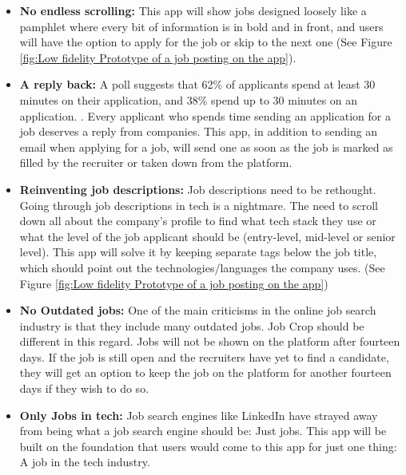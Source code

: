 \begin{itemize}
    \item \textbf{No endless scrolling:} This app will show jobs designed loosely like a pamphlet where every bit of information is in bold and in front, and users will have the option to apply for the job or skip to the next one (See Figure \ref{fig:Low fidelity Prototype of a job posting on the app}). 
    \item \textbf{A reply back:} A poll suggests that 62\% of applicants spend at least 30 minutes on their application, and 38\% spend up to 30 minutes on an application. \parencite{Reference18}. Every applicant who spends time sending an application for a job deserves a reply from companies. This app, in addition to sending an email when applying for a job, will send one as soon as the job is marked as filled by the recruiter or taken down from the platform.
    \item \textbf{Reinventing job descriptions:} Job descriptions need to be rethought. Going through job descriptions in tech is a nightmare. The need to scroll down all about the company's profile to find what tech stack they use or what the level of the job applicant should be (entry-level, mid-level or senior level). This app will solve it by keeping separate tags below the job title, which should point out the technologies/languages the company uses. (See Figure \ref{fig:Low fidelity Prototype of a job posting on the app})
    \item \textbf{No Outdated jobs:} One of the main criticisms in the online job search industry is that they include many outdated jobs. Job Crop should be different in this regard. Jobs will not be shown on the platform after fourteen days. If the job is still open and the recruiters have yet to find a candidate, they will get an option to keep the job on the platform for another fourteen days if they wish to do so.
    \item \textbf{Only Jobs in tech:} Job search engines like LinkedIn have strayed away from being what a job search engine should be: Just jobs. This app will be built on the foundation that users would come to this app for just one thing: A job in the tech industry.
\end{itemize}